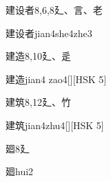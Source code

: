 \begin{Entry}{建设者}{8,6,8}{⼵、⾔、⽼}
  \begin{Phonetics}{建设者}{jian4she4zhe3}
  \end{Phonetics}
\end{Entry}

\begin{Entry}{建造}{8,10}{⼵、⾡}
  \begin{Phonetics}{建造}{jian4 zao4}[][HSK 5]
  \end{Phonetics}
\end{Entry}

\begin{Entry}{建筑}{8,12}{⼵、⽵}
  \begin{Phonetics}{建筑}{jian4zhu4}[][HSK 5]
  \end{Phonetics}
\end{Entry}

\begin{Entry}{廻}{8}{⼵}
  \begin{Phonetics}{廻}{hui2}
  \end{Phonetics}
\end{Entry}



